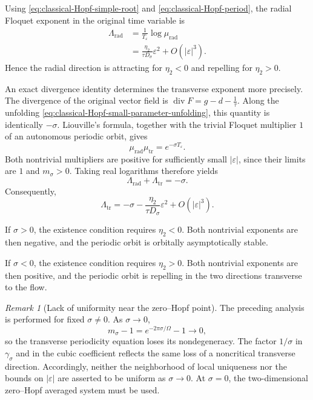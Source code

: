 \documentclass[11pt,reqno]{amsart}
\theoremstyle{plain}
\theoremstyle{definition}
\theoremstyle{remark}
\newtheorem{remark}[theorem]{Remark}
\begin{document}
Using
\eqref{eq:classical-Hopf-simple-root} and
\eqref{eq:classical-Hopf-period}, the radial Floquet
exponent in the original time variable is
\[
\begin{aligned}
\Lambda_{\mathrm{rad}}
&=
\frac1{T_\varepsilon}\log\mu_{\mathrm{rad}}\\
&=
\frac{\eta_2}{\tau D_\sigma}\varepsilon^2
+O(|\varepsilon|^3).
\end{aligned}
\]
Hence the radial direction is attracting for $\eta_2<0$
and repelling for $\eta_2>0$.

An exact divergence identity determines the transverse
exponent more precisely. The divergence of the original
vector field is
$
\operatorname{div}F
=
g-d-\frac1\tau.
$
Along the unfolding
\eqref{eq:classical-Hopf-small-parameter-unfolding}, this
quantity is identically $-\sigma$.
Liouville's formula, together with the trivial Floquet
multiplier $1$ of an autonomous periodic orbit, gives
\begin{equation}
\label{eq:classical-Hopf-multiplier-product}
\mu_{\mathrm{rad}}\mu_{\mathrm{tr}}
=
e^{-\sigma T_\varepsilon}.
\end{equation}
Both nontrivial multipliers are positive for sufficiently
small $|\varepsilon|$, since their limits are $1$ and
$m_\sigma>0$. Taking real logarithms therefore yields
\begin{equation}
\label{eq:classical-Hopf-exponent-sum}
\Lambda_{\mathrm{rad}}+\Lambda_{\mathrm{tr}}
=
-\sigma.
\end{equation}
Consequently,
\begin{equation}
\label{eq:classical-Hopf-transverse-exponent}
\Lambda_{\mathrm{tr}}
=
-\sigma
-\frac{\eta_2}{\tau D_\sigma}\varepsilon^2
+O(|\varepsilon|^3).
\end{equation}

If $\sigma>0$, the existence condition requires
$\eta_2<0$. Both nontrivial exponents are then negative,
and the periodic orbit is orbitally asymptotically stable.

If $\sigma<0$, the existence condition requires
$\eta_2>0$. Both nontrivial exponents are then positive,
and the periodic orbit is repelling in the two directions
transverse to the flow.

\begin{remark}[Lack of uniformity near the zero--Hopf point]
\label{rem:classical-Hopf-nonuniformity}
The preceding analysis is performed for fixed
$\sigma\neq0$. As $\sigma\to0$,
\[
m_\sigma-1=e^{-2\pi\sigma/\Omega}-1\longrightarrow0,
\]
so the transverse periodicity equation loses its
nondegeneracy. The factor $1/\sigma$ in
$\gamma_\sigma$ and in the cubic coefficient reflects
the same loss of a noncritical transverse direction.
Accordingly, neither the neighborhood of local uniqueness
nor the bounds on $|\varepsilon|$ are asserted to be
uniform as $\sigma\to0$. At $\sigma=0$, the
two-dimensional zero--Hopf averaged system must be used.
\end{remark}
\end{document}
